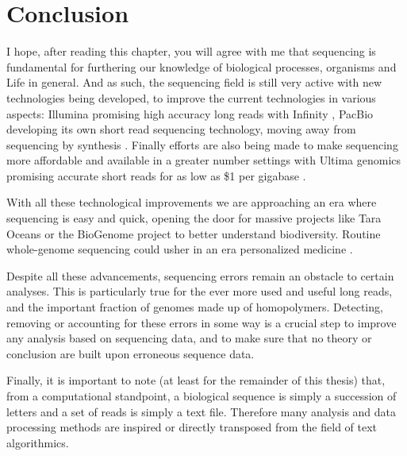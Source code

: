 \documentclass[
  11pt,
  twoside]{scrbook}
\begin{document}
\hypertarget{conclusion}{%
\section{Conclusion}\label{conclusion}}

I hope, after reading this chapter, you will agree with me that sequencing is fundamental for furthering our knowledge of biological processes, organisms and Life in general. And as such, the sequencing field is still very active with new technologies being developed, to improve the current technologies in various aspects: Illumina promising high accuracy long reads with Infinity \autocite{HighPerformanceLong}, PacBio developing its own short read sequencing technology, moving away from sequencing by synthesis \autocite{ShortreadSequencingBinding,cetinPlasmonicSensorCould2018}. Finally efforts are also being made to make sequencing more affordable and available in a greater number settings with Ultima genomics promising accurate short reads for as low as \$1 per gigabase \autocite{almogyCostefficientWholeGenomesequencing2022}.

With all these technological improvements we are approaching an era where sequencing is easy and quick, opening the door for massive projects like Tara Oceans \autocite{sunagawaTaraOceansGlobal2020} or the BioGenome project \autocite{lewinEarthBioGenomeProject2018} to better understand biodiversity. Routine whole-genome sequencing could usher in an era personalized medicine \autocite{lightbodyReviewApplicationsHighthroughput2019}.

Despite all these advancements, sequencing errors remain an obstacle to certain analyses. This is particularly true for the ever more used and useful long reads, and the important fraction of genomes made up of homopolymers. Detecting, removing or accounting for these errors in some way is a crucial step to improve any analysis based on sequencing data, and to make sure that no theory or conclusion are built upon erroneous sequence data.

Finally, it is important to note (at least for the remainder of this thesis) that, from a computational standpoint, a biological sequence is simply a succession of letters and a set of reads is simply a text file. Therefore many analysis and data processing methods are inspired or directly transposed from the field of text algorithmics.

\printbibliography[segment=\therefsegment,heading=subbibintoc,title={References for chapter \thechapter}]
\end{document}
